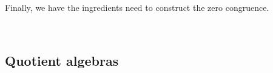 \documentclass[a4paper,UKenglish,cleveref,autoref,thm-restate,11pt]{lipics-v2021}
\begin{document}
\ccpad
Finally, we have the ingredients need to construct the zero congruence.
\ccpad
\begin{code}%
\>[0]\AgdaSpace{}%
\AgdaSymbol{:}\AgdaSpace{}%
\AgdaSymbol{\{}\AgdaSpace{}%
\AgdaSymbol{:}\AgdaSpace{}%
\AgdaSymbol{\}}\AgdaSpace{}%
\AgdaSpace{}%
\AgdaSpace{}%
\AgdaSpace{}%
\AgdaSpace{}%
\AgdaSpace{}%
\AgdaSymbol{(}\AgdaSpace{}%
\AgdaSymbol{:}\AgdaSpace{}%
\AgdaSpace{}%
\AgdaSpace{}%
\AgdaSymbol{)}\AgdaSpace{}%
\AgdaSpace{}%
\AgdaSpace{}%
\<%
\\
\>[0]\AgdaSpace{}%
\AgdaSpace{}%
\AgdaSpace{}%
\AgdaSymbol{=}\AgdaSpace{}%
\AgdaSpace{}%
\AgdaSpace{}%
\AgdaSymbol{(}\AgdaSpace{}%
\AgdaSpace{}%
\AgdaSpace{}%
\AgdaSymbol{)}\AgdaSpace{}%
\AgdaSymbol{(}\AgdaSpace{}%
\AgdaSpace{}%
\AgdaSymbol{)}\<%
\end{code}








\subsection{Quotient algebras}\label{quotient-algebras}
\end{document}
